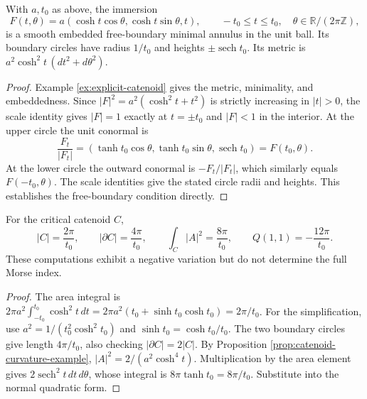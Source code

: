 \begin{example}\label{ex:critical-catenoid}
With $a,t_0$ as above, the immersion
\[
 F(t,\theta)=a(\cosh t\cos\theta,\cosh t\sin\theta,t),
 \qquad -t_0\leq t\leq t_0,\quad \theta\in\mathbb R/(2\pi\mathbb Z),
\]
is a smooth embedded free-boundary minimal annulus in the unit ball. Its boundary circles have radius $1/t_0$ and heights $\pm\operatorname{sech}t_0$. Its metric is $a^2\cosh^2t\,(dt^2+d\theta^2)$.
\end{example}
\begin{proof}
Example \ref{ex:explicit-catenoid} gives the metric, minimality, and embeddedness. Since $|F|^2=a^2(\cosh^2t+t^2)$ is strictly increasing in $|t|>0$, the scale identity gives $|F|=1$ exactly at $t=\pm t_0$ and $|F|<1$ in the interior. At the upper circle the unit conormal is
\[
 \frac{F_t}{|F_t|}=(\tanh t_0\cos\theta,\tanh t_0\sin\theta,\operatorname{sech}t_0)=F(t_0,\theta).
\]
At the lower circle the outward conormal is $-F_t/|F_t|$, which similarly equals $F(-t_0,\theta)$. The scale identities give the stated circle radii and heights. This establishes the free-boundary condition directly.
\end{proof}

\begin{proposition}\label{prop:critical-catenoid-integrals}
For the critical catenoid $C$,
\[
 |C|=\frac{2\pi}{t_0},\qquad |\partial C|=\frac{4\pi}{t_0},\qquad
 \int_C|A|^2=\frac{8\pi}{t_0},\qquad Q(1,1)=-\frac{12\pi}{t_0}.
\]
These computations exhibit a negative variation but do not determine the full Morse index.
\end{proposition}
\begin{proof}
The area integral is
$2\pi a^2\int_{-t_0}^{t_0}\cosh^2t\,dt=2\pi a^2(t_0+\sinh t_0\cosh t_0)=2\pi/t_0$.
For the simplification, use $a^2=1/(t_0^2\cosh^2t_0)$ and $\sinh t_0=\cosh t_0/t_0$. The two boundary circles give length $4\pi/t_0$, also checking $|\partial C|=2|C|$. By Proposition \ref{prop:catenoid-curvature-example}, $|A|^2=2/(a^2\cosh^4t)$. Multiplication by the area element gives $2\operatorname{sech}^2t\,dt\,d\theta$, whose integral is $8\pi\tanh t_0=8\pi/t_0$. Substitute into the normal quadratic form.
\end{proof}

